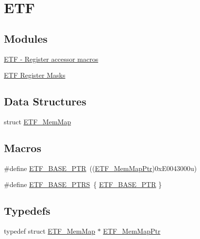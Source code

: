 \hypertarget{group___e_t_f___peripheral}{}\section{E\+T\+F}
\label{group___e_t_f___peripheral}
\subsection*{Modules}
\begin{DoxyCompactItemize}
\item 
\hyperlink{group___e_t_f___register___accessor___macros}{E\+T\+F -\/ Register accessor macros}
\item 
\hyperlink{group___e_t_f___register___masks}{E\+T\+F Register Masks}
\end{DoxyCompactItemize}
\subsection*{Data Structures}
\begin{DoxyCompactItemize}
\item 
struct \hyperlink{struct_e_t_f___mem_map}{E\+T\+F\+\_\+\+Mem\+Map}
\end{DoxyCompactItemize}
\subsection*{Macros}
\begin{DoxyCompactItemize}
\item 
\#define \hyperlink{group___e_t_f___peripheral_ga46da3f879a5311a0651d7908021daa5e}{E\+T\+F\+\_\+\+B\+A\+S\+E\+\_\+\+P\+T\+R}~((\hyperlink{group___e_t_f___peripheral_ga3b20bc884bec4b23870d47a4e2f9a118}{E\+T\+F\+\_\+\+Mem\+Map\+Ptr})0x\+E0043000u)
\item 
\#define \hyperlink{group___e_t_f___peripheral_ga9b5fbcfe81b6b5df44eca49c314c4806}{E\+T\+F\+\_\+\+B\+A\+S\+E\+\_\+\+P\+T\+R\+S}~\{ \hyperlink{group___e_t_f___peripheral_ga46da3f879a5311a0651d7908021daa5e}{E\+T\+F\+\_\+\+B\+A\+S\+E\+\_\+\+P\+T\+R} \}
\end{DoxyCompactItemize}
\subsection*{Typedefs}
\begin{DoxyCompactItemize}
\item 
typedef struct \hyperlink{struct_e_t_f___mem_map}{E\+T\+F\+\_\+\+Mem\+Map} $\ast$ \hyperlink{group___e_t_f___peripheral_ga3b20bc884bec4b23870d47a4e2f9a118}{E\+T\+F\+\_\+\+Mem\+Map\+Ptr}
\end{DoxyCompactItemize}



